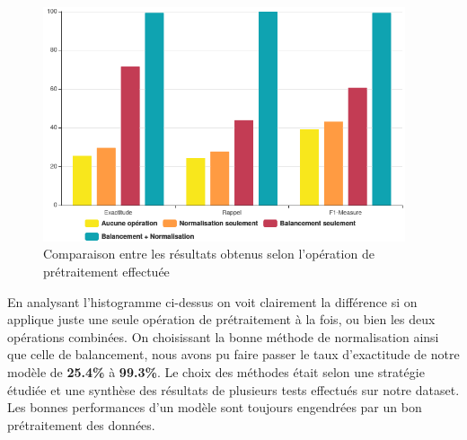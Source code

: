 \begin{figure}[h]
\centering
\includegraphics[width=0.95\textwidth]{Figures/performances}
\decoRule
\caption{Comparaison entre les résultats obtenus selon l'opération de prétraitement effectuée}
\label{fig:histogramme}
\end{figure} 
\newpage
En analysant l'histogramme ci-dessus on voit clairement la différence si on applique juste une seule opération de prétraitement à la fois, ou bien les deux opérations combinées. On choisissant la bonne méthode de normalisation ainsi que celle de balancement, nous avons pu faire passer le taux d'exactitude de notre modèle de \textbf{25.4\%} à \textbf{99.3\%}. Le choix des méthodes était selon une stratégie étudiée et une synthèse des résultats de plusieurs tests effectués sur notre dataset. Les bonnes performances d'un modèle sont toujours engendrées par un bon prétraitement des données.

\newpage
